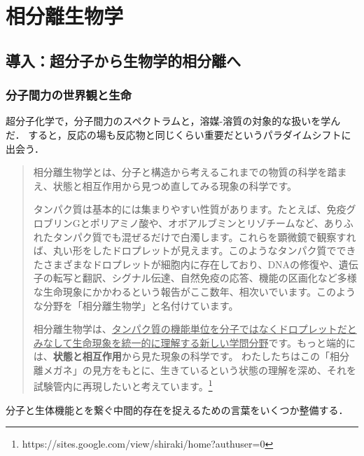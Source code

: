 \documentclass[uplatex, dvipdfmx]{jsreport}
\begin{document}
\part{相分離生物学}\label{part-biological-phase-separation}

\chapter{導入：超分子から生物学的相分離へ}
\section{分子間力の世界観と生命}

超分子化学で，分子間力のスペクトラムと，溶媒-溶質の対象的な扱いを学んだ．
すると，反応の場も反応物と同じくらい重要だというパラダイムシフトに出会う．

\begin{quotation}
    相分離生物学とは、分子と構造から考えるこれまでの物質の科学を踏まえ、状態と相互作用から見つめ直してみる現象の科学です。

    タンパク質は基本的には集まりやすい性質があります。たとえば、免疫グロブリンGとポリアミノ酸や、オボアルブミンとリゾチームなど、ありふれたタンパク質でも混ぜるだけで白濁します。これらを顕微鏡で観察すれば、丸い形をしたドロプレットが見えます。このようなタンパク質でできたさまざまなドロプレットが細胞内に存在しており、DNAの修復や、遺伝子の転写と翻訳、シグナル伝達、自然免疫の応答、機能の区画化など多様な生命現象にかかわるという報告がここ数年、相次いでいます。このような分野を「相分離生物学」と名付けています。
    
    相分離生物学は、\underline{タンパク質の機能単位を分子ではなくドロプレットだとみなして生命現象を統一的に理解する新しい学問分野}です。もっと端的には、\textbf{状態と相互作用}から見た現象の科学です。
    わたしたちはこの「相分離メガネ」の見方をもとに、生きているという状態の理解を深め、それを試験管内に再現したいと考えています。\footnote{https://sites.google.com/view/shiraki/home?authuser=0}
\end{quotation}

分子と生体機能とを繋ぐ中間的存在を捉えるための言葉をいくつか整備する．
\end{document}
